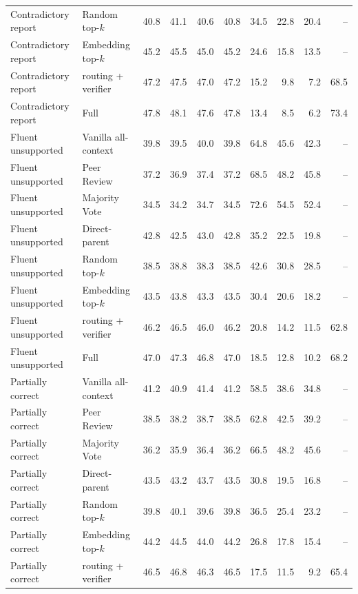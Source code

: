 \begin{longtable}{llrrrrrrrr}
Contradictory report & Random top-$k$ & 40.8 & 41.1 & 40.6 & 40.8 & 34.5 & 22.8 & 20.4 & -- \\
Contradictory report & Embedding top-$k$ & 45.2 & 45.5 & 45.0 & 45.2 & 24.6 & 15.8 & 13.5 & -- \\
Contradictory report & \method{} routing + verifier & 47.2 & 47.5 & 47.0 & 47.2 & 15.2 & 9.8 & 7.2 & 68.5 \\
\rowcolor{tracesoft}
Contradictory report & \method{} Full & 47.8 & 48.1 & 47.6 & 47.8 & 13.4 & 8.5 & 6.2 & 73.4 \\
\midrule
Fluent unsupported & Vanilla all-context & 39.8 & 39.5 & 40.0 & 39.8 & 64.8 & 45.6 & 42.3 & -- \\
Fluent unsupported & Peer Review & 37.2 & 36.9 & 37.4 & 37.2 & 68.5 & 48.2 & 45.8 & -- \\
Fluent unsupported & Majority Vote & 34.5 & 34.2 & 34.7 & 34.5 & 72.6 & 54.5 & 52.4 & -- \\
Fluent unsupported & Direct-parent & 42.8 & 42.5 & 43.0 & 42.8 & 35.2 & 22.5 & 19.8 & -- \\
Fluent unsupported & Random top-$k$ & 38.5 & 38.8 & 38.3 & 38.5 & 42.6 & 30.8 & 28.5 & -- \\
Fluent unsupported & Embedding top-$k$ & 43.5 & 43.8 & 43.3 & 43.5 & 30.4 & 20.6 & 18.2 & -- \\
Fluent unsupported & \method{} routing + verifier & 46.2 & 46.5 & 46.0 & 46.2 & 20.8 & 14.2 & 11.5 & 62.8 \\
\rowcolor{tracesoft}
Fluent unsupported & \method{} Full & 47.0 & 47.3 & 46.8 & 47.0 & 18.5 & 12.8 & 10.2 & 68.2 \\
\midrule
Partially correct & Vanilla all-context & 41.2 & 40.9 & 41.4 & 41.2 & 58.5 & 38.6 & 34.8 & -- \\
Partially correct & Peer Review & 38.5 & 38.2 & 38.7 & 38.5 & 62.8 & 42.5 & 39.2 & -- \\
Partially correct & Majority Vote & 36.2 & 35.9 & 36.4 & 36.2 & 66.5 & 48.2 & 45.6 & -- \\
Partially correct & Direct-parent & 43.5 & 43.2 & 43.7 & 43.5 & 30.8 & 19.5 & 16.8 & -- \\
Partially correct & Random top-$k$ & 39.8 & 40.1 & 39.6 & 39.8 & 36.5 & 25.4 & 23.2 & -- \\
Partially correct & Embedding top-$k$ & 44.2 & 44.5 & 44.0 & 44.2 & 26.8 & 17.8 & 15.4 & -- \\
Partially correct & \method{} routing + verifier & 46.5 & 46.8 & 46.3 & 46.5 & 17.5 & 11.5 & 9.2 & 65.4 \\

\end{longtable}
